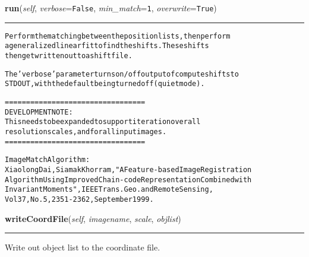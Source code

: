     \begin{boxedminipage}{\textwidth}

    \raggedright \textbf{run}(\textit{self}, \textit{verbose}=\texttt{F\-a\-l\-s\-e\-}, \textit{min\_match}=\texttt{1\-}, \textit{overwrite}=\texttt{T\-r\-u\-e\-})

    \vspace{-1.5ex}

    \rule{\textwidth}{0.5\fboxrule}
\begin{alltt}
Perform the matching between the position lists, then perform
a generalized linear fit to find the shifts.  These shifts
then get written out to a shiftfile.

The 'verbose' parameter turns on/off output of compute shifts to
STDOUT, with the default being turned off (quiet mode).

=================================
DEVELOPMENT NOTE:
    This needs to be expanded to support iteration over all
    resolution scales, and for all input images.
=================================

ImageMatch Algorithm:
Xiaolong Dai, Siamak Khorram, "A Feature-based Image Registration
Algorithm Using Improved Chain-code Representation Combined with
Invariant Moments", IEEE Trans. Geo. and Remote Sensing,
Vol 37, No. 5, 2351-2362, September 1999.\end{alltt}

    \vspace{1ex}

    \end{boxedminipage}

    \label{multireg:imageshift:ImageShift:writeCoordFile}
    \vspace{0.5ex}

    \begin{boxedminipage}{\textwidth}

    \raggedright \textbf{writeCoordFile}(\textit{self}, \textit{imagename}, \textit{scale}, \textit{objlist})

    \vspace{-1.5ex}

    \rule{\textwidth}{0.5\fboxrule}
    Write out object list to the coordinate file.

    \vspace{1ex}

    \end{boxedminipage}

